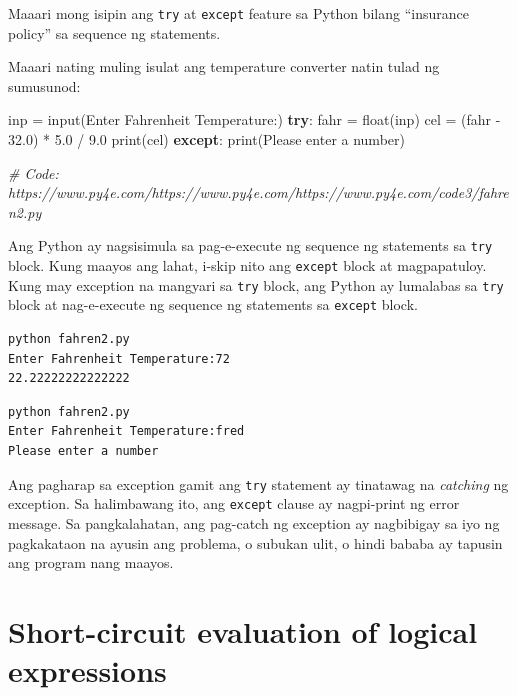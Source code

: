 \documentclass[10pt,]{book}
\newenvironment{Shaded}{}{}
\newcommand{\BuiltInTok}[1]{\textcolor[rgb]{0.00,0.50,0.00}{#1}}
\newcommand{\CommentTok}[1]{\textcolor[rgb]{0.38,0.63,0.69}{\textit{#1}}}
\newcommand{\ControlFlowTok}[1]{\textcolor[rgb]{0.00,0.44,0.13}{\textbf{#1}}}
\newcommand{\FloatTok}[1]{\textcolor[rgb]{0.25,0.63,0.44}{#1}}
\newcommand{\NormalTok}[1]{#1}
\newcommand{\OperatorTok}[1]{\textcolor[rgb]{0.40,0.40,0.40}{#1}}
\newcommand{\StringTok}[1]{\textcolor[rgb]{0.25,0.44,0.63}{#1}}
\begin{document}
Maaari mong isipin ang \texttt{try} at \texttt{except} feature sa Python
bilang ``insurance policy'' sa sequence ng statements.

Maaari nating muling isulat ang temperature converter natin tulad ng
sumusunod:

\begin{Shaded}
\begin{Highlighting}[]
\NormalTok{inp }\OperatorTok{=} \BuiltInTok{input}\NormalTok{(}\StringTok{\textquotesingle{}Enter Fahrenheit Temperature:\textquotesingle{}}\NormalTok{)}
\ControlFlowTok{try}\NormalTok{:}
\NormalTok{    fahr }\OperatorTok{=} \BuiltInTok{float}\NormalTok{(inp)}
\NormalTok{    cel }\OperatorTok{=}\NormalTok{ (fahr }\OperatorTok{{-}} \FloatTok{32.0}\NormalTok{) }\OperatorTok{*} \FloatTok{5.0} \OperatorTok{/} \FloatTok{9.0}
    \BuiltInTok{print}\NormalTok{(cel)}
\ControlFlowTok{except}\NormalTok{:}
    \BuiltInTok{print}\NormalTok{(}\StringTok{\textquotesingle{}Please enter a number\textquotesingle{}}\NormalTok{)}

\CommentTok{\# Code: https://www.py4e.com/https://www.py4e.com/https://www.py4e.com/code3/fahren2.py}
\end{Highlighting}
\end{Shaded}

Ang Python ay nagsisimula sa pag-e-execute ng sequence ng statements sa
\texttt{try} block. Kung maayos ang lahat, i-skip nito ang
\texttt{except} block at magpapatuloy. Kung may exception na mangyari sa
\texttt{try} block, ang Python ay lumalabas sa \texttt{try} block at
nag-e-execute ng sequence ng statements sa \texttt{except} block.

{\small
\begin{verbatim}
python fahren2.py
Enter Fahrenheit Temperature:72
22.22222222222222
\end{verbatim}
}

{\small
\begin{verbatim}
python fahren2.py
Enter Fahrenheit Temperature:fred
Please enter a number
\end{verbatim}
}

Ang pagharap sa exception gamit ang \texttt{try} statement ay tinatawag
na \emph{catching} ng exception. Sa halimbawang ito, ang \texttt{except}
clause ay nagpi-print ng error message. Sa pangkalahatan, ang pag-catch
ng exception ay nagbibigay sa iyo ng pagkakataon na ayusin ang problema,
o subukan ulit, o hindi bababa ay tapusin ang program nang maayos.

\section{Short-circuit evaluation of logical
expressions}\label{short-circuit-evaluation-of-logical-expressions}
\end{document}
